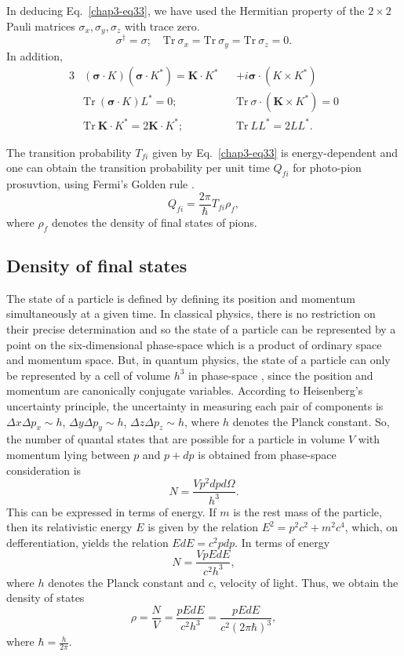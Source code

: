 In deducing Eq.\ \eqref{chap3-eq33}, we have used the Hermitian property of the $2 \times 2$ Pauli matrices $\sigma_x, \sigma_y, \sigma_z$ with trace zero.
$$
\sigma^\dagger = \sigma; \quad \text{Tr}~ \sigma_x = \text{Tr}~ \sigma_y = \text{Tr}~ \sigma_z =0.
$$
In addition,
\begin{alignat*}{3}
  &({\boldsymbol  \sigma \cdot K}) ({\boldsymbol  \sigma \cdot K}^\ast) = {\boldsymbol  K \cdot K}^\ast && +  i{\boldsymbol  \sigma \cdot (K \times K^\ast)}\\
  & \text{Tr}~  ({\boldsymbol  \sigma \cdot K})L^\ast =0; && \text{Tr}~ \sigma \cdot ({\boldsymbol  K \times K}^\ast)=0\\
  & \text{Tr}~ {\boldsymbol  K \cdot K}^\ast = 2 {\boldsymbol  K \cdot K}^\ast; & &\text{Tr}~LL^\ast = 2LL^\ast.
\end{alignat*}

The transition probability $T_{fi}$ given by Eq.\ \eqref{chap3-eq33} is energy-dependent and one can obtain the transition probability per unit time $Q_{fi}$ for photo-pion prosuvtion, using Fermi's Golden rule \cite{chap3-key23}.
\begin{equation}
  Q_{fi}= \frac{2 \pi}{\hbar} T_{fi} \rho_f, \label{chap3-eq34}
\end{equation}
where $\rho_f$ denotes the density of final states of pions.

\subsection{Density of final states}\label{chap3-sec4.1}

The state of a particle is defined by defining its position and momentum simultaneously at a given time. In classical physics, there is no restriction on their precise determination and so the state of a particle can be represented by a point on the six-dimensional phase-space which is a product of ordinary space and momentum space. But, in quantum physics, the state of a particle can only be represented by a cell of volume $h^3$ in phase-space \cite{chap3-key24}, since the position and momentum are canonically conjugate variables. According to Heisenberg's uncertainty principle, the uncertainty in measuring each pair of components is $\Delta x \Delta p_x \sim h$, $\Delta y \Delta p_y \sim h$, $\Delta z \Delta p_z \sim h$, where $h$ denotes the Planck constant. So, the number of quantal states that are possible for a particle in volume $V$ with momentum lying between $p$ and $p + dp$ is obtained from phase-space consideration \cite{chap3-key24} is
$$
N = \frac{Vp^2 dpd\Omega}{h^3}.
$$
This can be expressed in terms of energy. If $m$ is the rest mass of the particle, then its relativistic energy $E$ is given by the relation $E^2= p^2 c^2+ m^2 c^4$, which, on defferentiation, yields the relation $EdE=c^2pdp$. In terms of energy
$$
N= \frac{Vp{EdE}}{c^2 h^3},
$$
where $h$ denotes the Planck constant and $c$, velocity of light. Thus, we obtain the density of states
$$
\rho = \frac{N}{V} = \frac{p{EdE}}{c^2 h^3} = \frac{p{EdE}}{c^2 (2\pi \hbar)^3},
$$
where $\hbar = \tfrac{h}{2\pi}$.

